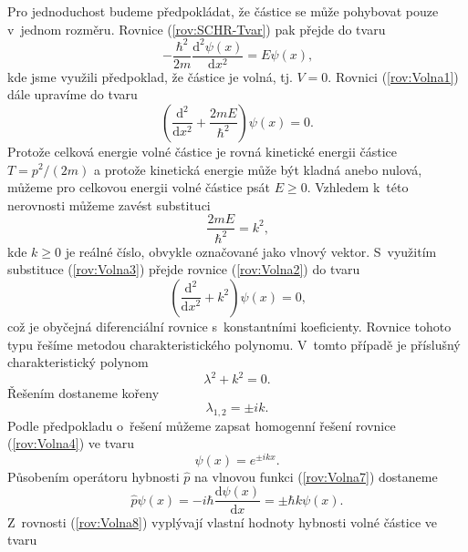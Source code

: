 Pro jednoduchost budeme předpokládat, že částice se může pohybovat pouze v~jednom rozměru. Rovnice (\ref{rov:SCHR-Tvar}) pak přejde do tvaru
\begin{equation}
-\frac{\hbar^2}{2m} \frac{\mathrm{d}^2\psi(x)}{\mathrm{d}x^2} = E \psi(x) \mbox{,}
\label{rov:Volna1}
\end{equation}
kde jsme využili předpoklad, že částice je volná, tj. $V = 0$. Rovnici (\ref{rov:Volna1}) dále upravíme do tvaru
\begin{equation}
\left( \frac{\mathrm{d}^2}{\mathrm{d}x^2} + \frac{2mE}{\hbar^2} \right) \psi(x) = 0 \mbox{.}
\label{rov:Volna2}
\end{equation}
Protože celková energie volné částice je rovná kinetické energii částice $T=p^2/(2m)$ a protože kinetická energie může být kladná anebo nulová, můžeme pro celkovou energii volné částice psát $E \geq 0$. Vzhledem k~této nerovnosti můžeme zavést substituci
\begin{equation}
\frac{2mE}{\hbar^2} = k^2 \mbox{,}
\label{rov:Volna3}
\end{equation}
kde $k\geq0$ je reálné číslo, obvykle označované jako vlnový vektor. S~využitím substituce (\ref{rov:Volna3}) přejde rovnice (\ref{rov:Volna2}) do tvaru
\begin{equation}
\left( \frac{\mathrm{d}^2}{\mathrm{d}x^2} + k^2 \right) \psi(x) = 0 \mbox{,}
\label{rov:Volna4}
\end{equation}
což je obyčejná diferenciální rovnice s~konstantními koeficienty. Rovnice tohoto typu řešíme metodou charakteristického polynomu. V~tomto případě je příslušný charakteristický polynom
\begin{equation}
\lambda^2 + k^2 = 0 \mbox{.}
\label{rov:Volna5}
\end{equation}
Řešením dostaneme kořeny
\begin{equation}
\lambda_{1,2} = \pm ik \mbox{.}
\label{rov:Volna6}
\end{equation}
Podle předpokladu o~řešení můžeme zapsat homogenní řešení rovnice (\ref{rov:Volna4}) ve tvaru
\begin{equation}
\psi(x) = e^{\pm ikx} \mbox{.}
\label{rov:Volna7}
\end{equation}
Působením operátoru hybnosti  $\hat{p}$ na vlnovou funkci (\ref{rov:Volna7}) dostaneme
\begin{equation}
\hat{p} \psi(x) = -i\hbar \frac{\mathrm{d}\psi(x)}{\mathrm{d}x} = \pm \hbar k \psi(x) \mbox{.}
\label{rov:Volna8}
\end{equation}
Z~rovnosti (\ref{rov:Volna8}) vyplývají vlastní hodnoty hybnosti volné částice ve tvaru

